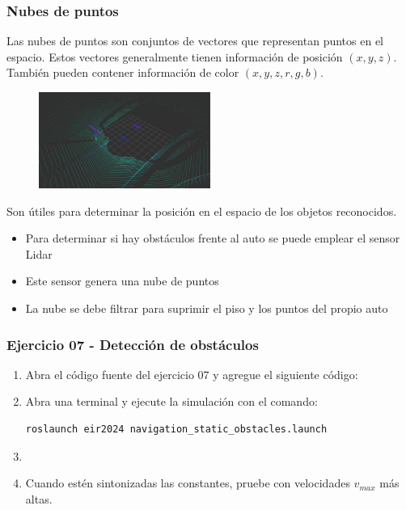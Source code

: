 \begin{frame}\frametitle{Nubes de puntos}
  Las nubes de puntos son conjuntos de vectores que representan puntos en el espacio. Estos vectores generalmente tienen información de posición $(x,y,z)$. También pueden contener información de color $(x,y,z,r,g,b)$.
  \begin{figure}
      \centering
      \includegraphics[width=0.5\textwidth]{Figuras/CloudExample.png}
  \end{figure}
  Son útiles para determinar la posición en el espacio de los objetos reconocidos.
  \begin{itemize}
  \item Para determinar si hay obstáculos frente al auto se puede emplear el sensor Lidar
  \item Este sensor genera una nube de puntos
  \item La nube se debe filtrar para suprimir el piso y los puntos del propio auto
  \end{itemize}
\end{frame}

\begin{frame}[containsverbatim]\frametitle{Ejercicio 07 - Detección de obstáculos}
  \begin{enumerate}
  \item Abra el código fuente del ejercicio 07 y agregue el siguiente código:
    
  \item Abra una terminal y ejecute la simulación con el comando:
    \begin{lstlisting}[language=bash,numbers=none]
roslaunch eir2024 navigation_static_obstacles.launch
    \end{lstlisting}
  \item 
  \item Cuando estén sintonizadas las constantes, pruebe con velocidades $v_{max}$ más altas.
  \end{enumerate}
\end{frame}
